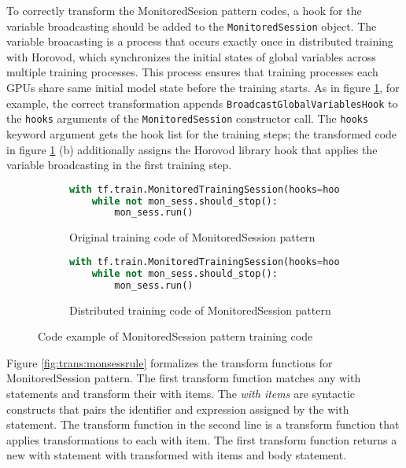 To correctly transform the MonitoredSesion pattern codes,
a hook for the variable broadcasting should be added to the
{\tt MonitoredSession} object.
The variable broacasting is a process that occurs exactly once in
distributed training with Horovod,
which synchronizes the initial states of global variables across multiple
training processes.
This process ensures that training processes each GPUs share same initial
model state before the training starts. 
As in figure \ref{fig:trans:monsesstrans}, for example,
the correct transformation appends {\tt BroadcastGlobalVariablesHook} to the
{\tt hooks} arguments of the {\tt MonitoredSession} constructor call.
The {\tt hooks} keyword argument gets the hook list for the training steps;
the transformed code in figure \ref{fig:trans:monsesstrans}
(b) additionally assigns the Horovod library hook that applies
the variable broadcasting in the first training step.

\begin{figure}[ht!]
  \centering
  \begin{subfigure}[t]{0.45\textwidth}
    \begin{lstlisting}[language=Python]
with tf.train.MonitoredTrainingSession(hooks=hooks) as mon_sess:
    while not mon_sess.should_stop():
        mon_sess.run()
    \end{lstlisting}
    \caption{Original training code of MonitoredSession pattern}
  \end{subfigure}
  \hspace{5mm}
  \begin{subfigure}[t]{0.45\textwidth}
    \begin{lstlisting}[language=Python]
with tf.train.MonitoredTrainingSession(hooks=hooks.append(hvd.BroadcastGlobalVariablesHook(0)) as mon_sess:
    while not mon_sess.should_stop():
        mon_sess.run()
    \end{lstlisting}
    \caption{Distributed training code of MonitoredSession pattern}
  \end{subfigure}
  \caption{Code example of MonitoredSession pattern training code}
  \label{fig:trans:monsesstrans}
\end{figure}

Figure \ref{fig:trans:monsessrule} formalizes the transform functions for
MonitoredSession pattern.
The first transform function matches any with statements and transform their
with items. The \textit{with items} are syntactic constructs that 
pairs the identifier and expression assigned by the with statement.
The transform function \fkwwithitem in the second line is a 
transform function that applies transformations to each with item.
The first transform function returns a new with statement with transformed
with items and body statement.

